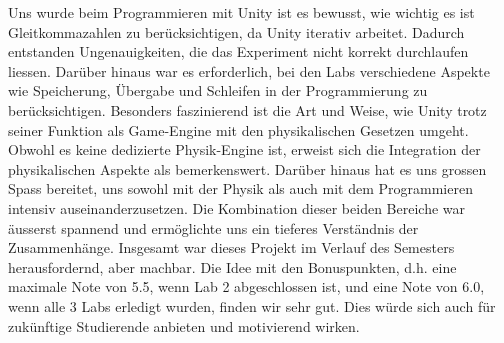 \documentclass[../main.tex]{subfiles}
\begin{document}
    \newline
    Uns wurde beim Programmieren mit Unity ist es bewusst, wie wichtig es ist Gleitkommazahlen zu berücksichtigen,
    da Unity iterativ arbeitet. Dadurch entstanden Ungenauigkeiten, die das Experiment nicht korrekt durchlaufen
    liessen. Darüber hinaus war es erforderlich, bei den Labs verschiedene Aspekte wie Speicherung, Übergabe und
    Schleifen in der Programmierung zu berücksichtigen.
    \newline
    Besonders faszinierend ist die Art und Weise, wie Unity trotz seiner Funktion als Game-Engine mit den
    physikalischen Gesetzen umgeht. Obwohl es keine dedizierte Physik-Engine ist, erweist sich die Integration
    der physikalischen Aspekte als bemerkenswert.
    \newline
    Darüber hinaus hat es uns grossen Spass bereitet, uns sowohl mit der Physik als auch mit dem Programmieren
    intensiv auseinanderzusetzen. Die Kombination dieser beiden Bereiche war äusserst spannend und ermöglichte
    uns ein tieferes Verständnis der Zusammenhänge.
    \newline
    Insgesamt war dieses Projekt im Verlauf des Semesters herausfordernd, aber machbar. Die Idee mit den
    Bonuspunkten, d.h. eine maximale Note von 5.5, wenn Lab 2 abgeschlossen ist, und eine Note von 6.0,
    wenn alle 3 Labs erledigt wurden, finden wir sehr gut. Dies würde sich auch für zukünftige Studierende
    anbieten und motivierend wirken.
\end{document}
